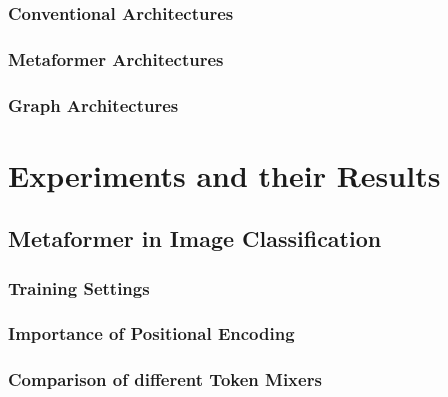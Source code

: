 \documentclass[
headings=optiontohead,              %
12pt,                               %
DIV=13,                             %
twoside=false,                      %
open=right,                         %
BCOR=10mm,                          %
toc=bibliographynumbered            %
]{scrreport}
\begin{document}
        \subsection{Conventional Architectures}
        \label{sec:architectures-biasesnormal}
        
        \FloatBarrier
        \subsection{Metaformer Architectures}
        \label{sec:architectures-biasesmetaformer}
        
        \FloatBarrier
        \subsection{Graph Architectures}
        \label{sec:architectures-biasesgraph}
        
        \FloatBarrier

\chapter{Experiments and their Results}
\label{sec:experiments}
    \section{Metaformer in Image Classification}
    \label{sec:experiments-image-classification}
    
        \subsection{Training Settings}
        \label{sec:experiments-trainingsettings}
        
        \FloatBarrier
        \subsection{Importance of Positional Encoding}
        \label{sec:experiments-positionalencoding}
        
        \FloatBarrier
        \subsection{Comparison of different Token Mixers}
        \label{sec:experiments-tokenmixers}
        
        \FloatBarrier
\end{document}
